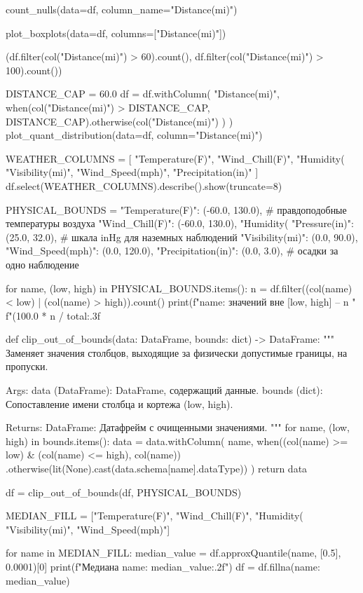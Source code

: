 \begin{code}
count_nulls(data=df, column_name="Distance(mi)")

plot_boxplots(data=df, columns=["Distance(mi)"])

(df.filter(col("Distance(mi)") > 60).count(),
df.filter(col("Distance(mi)") > 100).count())

DISTANCE_CAP = 60.0
df = df.withColumn(
    "Distance(mi)",
    when(col("Distance(mi)") > DISTANCE_CAP, DISTANCE_CAP).otherwise(col("Distance(mi)")
    )
)
plot_quant_distribution(data=df, column="Distance(mi)")

WEATHER_COLUMNS = [
    "Temperature(F)", "Wind_Chill(F)", "Humidity(%
    "Visibility(mi)", "Wind_Speed(mph)", "Precipitation(in)"
]
df.select(WEATHER_COLUMNS).describe().show(truncate=8)

PHYSICAL_BOUNDS = {
    "Temperature(F)": (-60.0, 130.0),   # правдоподобные температуры воздуха
    "Wind_Chill(F)": (-60.0, 130.0),
    "Humidity(%
    "Pressure(in)": (25.0, 32.0),       # шкала inHg для наземных наблюдений
    "Visibility(mi)": (0.0, 90.0),
    "Wind_Speed(mph)": (0.0, 120.0),
    "Precipitation(in)": (0.0, 3.0),    # осадки за одно наблюдение
}

for name, (low, high) in PHYSICAL_BOUNDS.items():
    n = df.filter((col(name) < low) | (col(name) > high)).count()
    print(f"{name}: значений вне [{low}, {high}] -- {n} "
          f"({100.0 * n / total:.3f}%

def clip_out_of_bounds(data: DataFrame, bounds: dict) -> DataFrame:
    """
    Заменяет значения столбцов, выходящие за физически допустимые
    границы, на пропуски.

    Args:
        data (DataFrame): DataFrame, содержащий данные.
        bounds (dict): Сопоставление имени столбца и кортежа (low, high).

    Returns:
        DataFrame: Датафрейм с очищенными значениями.
    """
    for name, (low, high) in bounds.items():
        data = data.withColumn(
            name,
            when((col(name) >= low) & (col(name) <= high), col(name))
            .otherwise(lit(None).cast(data.schema[name].dataType))
        )
    return data


df = clip_out_of_bounds(df, PHYSICAL_BOUNDS)

MEDIAN_FILL = ["Temperature(F)", "Wind_Chill(F)", "Humidity(%
               "Visibility(mi)", "Wind_Speed(mph)"]

for name in MEDIAN_FILL:
    median_value = df.approxQuantile(name, [0.5], 0.0001)[0]
    print(f"Медиана {name}: {median_value:.2f}")
    df = df.fillna({name: median_value})


\end{code}
